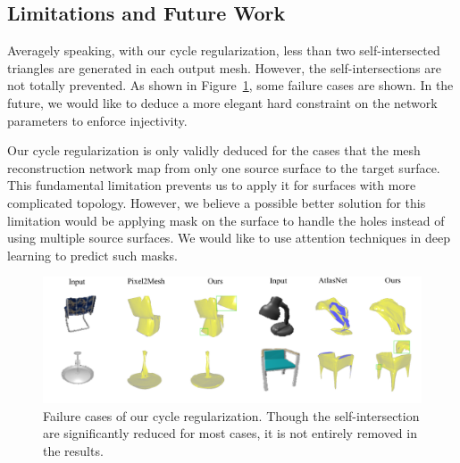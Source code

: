 \subsection{Limitations and Future Work}
Averagely speaking, with our cycle regularization, less than two self-intersected triangles are generated in each output mesh. However, the self-intersections are not totally prevented. As shown in Figure~\ref{fig:limit}, some failure cases are shown. In the future,  we would like to deduce a more elegant hard constraint on the network parameters to enforce injectivity.

Our cycle regularization is only validly deduced for the cases that the mesh reconstruction network map from only one source surface to the target surface. This fundamental limitation prevents us to apply it for surfaces with more complicated topology. However, we believe a possible better solution for this limitation would be applying mask on the surface to handle the holes instead of using multiple source surfaces. We would like to use attention techniques in deep learning to predict such masks.
\begin{figure}
	\centering
	\includegraphics[width=\textwidth]{img/limit/limit}
	\caption{Failure cases of our cycle regularization. Though the self-intersection are significantly reduced for most cases, it is not entirely removed in the results.}
	\label{fig:limit}
\end{figure}